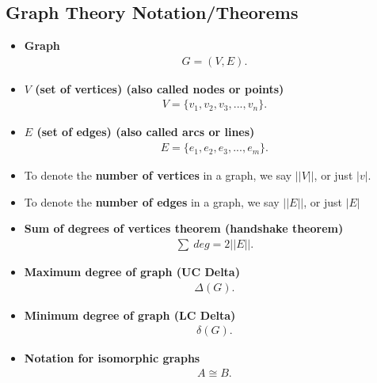\documentclass{report}
\begin{document}
      \subsection{Graph Theory Notation/Theorems}
      \bigbreak \noindent 
      \begin{itemize}
        \item \textbf{Graph}
          \begin{align*}
            G = (V,E)
          .\end{align*}
        \item \textbf{$V$ (set of vertices) (also called nodes or points)}
          \begin{align*}
            V = \{v_{1}, v_{2}, v_{3},...,v_{n}\}
          .\end{align*}
        \item \textbf{$E$ (set of edges) (also called arcs or lines)}
          \begin{align*}
            E = \{e_{1}, e_{2}, e_{3},...,e_{m}\}
          .\end{align*}
      \item To denote the \textbf{number of vertices} in a graph, we say $||V||$, or just $|v|$. 
      \item  To denote the \textbf{number of edges} in a graph, we say $||E||$, or just $|E|$
      \item \textbf{Sum of degrees of vertices theorem (handshake theorem)}
         \begin{align*}
           \sum\ deg = 2||E||
       .\end{align*} 
      \item \textbf{Maximum degree of graph (UC Delta)}
        \begin{align*}
          \Delta(G)
        .\end{align*}
          \item \textbf{Minimum degree of graph (LC Delta)}
        \begin{align*}
          \delta(G)
        .\end{align*}
      \item \textbf{Notation for isomorphic graphs}
        \begin{align*}
          A \cong B
        .\end{align*}
      \end{itemize}





      
\end{document}
